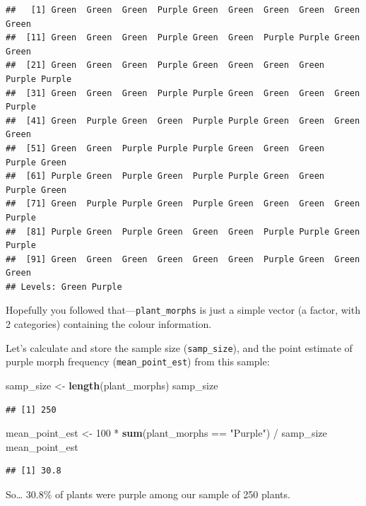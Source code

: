 \documentclass[]{book}
\newenvironment{Shaded}{\begin{snugshade}}{\end{snugshade}}
\newcommand{\KeywordTok}[1]{\textcolor[rgb]{0.13,0.29,0.53}{\textbf{{#1}}}}
\newcommand{\DecValTok}[1]{\textcolor[rgb]{0.00,0.00,0.81}{{#1}}}
\newcommand{\StringTok}[1]{\textcolor[rgb]{0.31,0.60,0.02}{{#1}}}
\newcommand{\NormalTok}[1]{{#1}}
\begin{document}
\begin{verbatim}
##   [1] Green  Green  Green  Purple Green  Green  Green  Green  Green  Green 
##  [11] Green  Green  Green  Purple Green  Green  Purple Purple Green  Green 
##  [21] Green  Green  Green  Purple Green  Green  Green  Green  Purple Purple
##  [31] Green  Green  Green  Purple Purple Green  Green  Green  Green  Purple
##  [41] Green  Purple Green  Green  Purple Purple Green  Green  Green  Green 
##  [51] Green  Green  Purple Purple Purple Green  Green  Green  Purple Green 
##  [61] Purple Green  Purple Green  Purple Purple Green  Green  Purple Green 
##  [71] Green  Purple Purple Green  Purple Green  Green  Green  Green  Purple
##  [81] Purple Green  Purple Green  Green  Green  Purple Purple Green  Purple
##  [91] Green  Green  Green  Green  Green  Green  Purple Green  Green  Green 
## Levels: Green Purple
\end{verbatim}

Hopefully you followed that---\texttt{plant\_morphs} is just a simple
vector (a factor, with 2 categories) containing the colour information.

Let's calculate and store the sample size (\texttt{samp\_size}), and the
point estimate of purple morph frequency (\texttt{mean\_point\_est})
from this sample:

\begin{Shaded}
\begin{Highlighting}[]
\NormalTok{samp_size <-}\StringTok{ }\KeywordTok{length}\NormalTok{(plant_morphs)}
\NormalTok{samp_size}
\end{Highlighting}
\end{Shaded}

\begin{verbatim}
## [1] 250
\end{verbatim}

\begin{Shaded}
\begin{Highlighting}[]
\NormalTok{mean_point_est <-}\StringTok{ }\DecValTok{100} \NormalTok{*}\StringTok{ }\KeywordTok{sum}\NormalTok{(plant_morphs ==}\StringTok{ "Purple"}\NormalTok{) /}\StringTok{ }\NormalTok{samp_size}
\NormalTok{mean_point_est}
\end{Highlighting}
\end{Shaded}

\begin{verbatim}
## [1] 30.8
\end{verbatim}

So\ldots{} 30.8\% of plants were purple among our sample of 250 plants.
\end{document}
